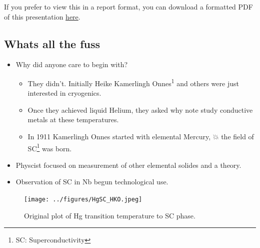 \documentclass[
]{scrartcl}
\providecommand{\tightlist}{%
  \setlength{\itemsep}{0pt}\setlength{\parskip}{0pt}}\usepackage{longtable,booktabs,array}
\begin{document}
\begin{tcolorbox}[enhanced jigsaw, opacitybacktitle=0.6, colframe=quarto-callout-tip-color-frame, toptitle=1mm, arc=.35mm, toprule=.15mm, rightrule=.15mm, title=\textcolor{quarto-callout-tip-color}{\faLightbulb}\hspace{0.5em}{Tip}, colbacktitle=quarto-callout-tip-color!10!white, opacityback=0, titlerule=0mm, bottomtitle=1mm, coltitle=black, leftrule=.75mm, bottomrule=.15mm, colback=white, breakable, left=2mm]

If you prefer to view this in a report format, you can download a
formatted PDF of this presentation
\href{presentation_reportformat.pdf}{here}.

\end{tcolorbox}

\hypertarget{whats-all-the-fuss}{%
\subsection{Whats all the fuss}\label{whats-all-the-fuss}}

\begin{itemize}
\tightlist
\item
  Why did anyone care to begin with?

  \begin{itemize}
  \tightlist
  \item
    They didn't. Initially Heike Kamerlingh Onnes\textsuperscript{1} and
    others were just interested in cryogenics.
  \item
    Once they achieved liquid Helium, they asked why note study
    conductive metals at these temperatures.
  \item
    In 1911 Kamerlingh Onnes started with elemental Mercury, 💥 the
    field of SC\footnote{SC: Superconductivity} was born.
  \end{itemize}
\item
  Physcist focused on measurement of other elemental solides and a
  theory.
\item
  Observation of SC in Nb begun technological use.
\end{itemize}

\begin{figure}[H]

{\centering \texttt{[image: ../figures/HgSC\_HKO.jpeg]}

}

\caption{Original plot of Hg transition temperature to SC phase.}

\end{figure}
\end{document}
